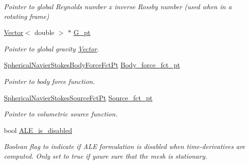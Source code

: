 \begin{DoxyCompactItemize}
\begin{DoxyCompactList}\small\item\em Pointer to global Reynolds number x inverse Rossby number (used when in a rotating frame) \end{DoxyCompactList}\item 
\hyperlink{classoomph_1_1Vector}{Vector}$<$ double $>$ $\ast$ \hyperlink{classoomph_1_1SphericalNavierStokesEquations_a658fccedce092b905f74278e882e34f1}{G\+\_\+pt}
\begin{DoxyCompactList}\small\item\em Pointer to global gravity \hyperlink{classoomph_1_1Vector}{Vector}. \end{DoxyCompactList}\item 
\hyperlink{classoomph_1_1SphericalNavierStokesEquations_aee36bea87063e9648a488de9e21f551d}{Spherical\+Navier\+Stokes\+Body\+Force\+Fct\+Pt} \hyperlink{classoomph_1_1SphericalNavierStokesEquations_ad1847f826dc0e33cb793319bfa41d985}{Body\+\_\+force\+\_\+fct\+\_\+pt}
\begin{DoxyCompactList}\small\item\em Pointer to body force function. \end{DoxyCompactList}\item 
\hyperlink{classoomph_1_1SphericalNavierStokesEquations_abd522fea532c3de15dbe80205e53bdf8}{Spherical\+Navier\+Stokes\+Source\+Fct\+Pt} \hyperlink{classoomph_1_1SphericalNavierStokesEquations_a0f8bbc9d353784821db5781ebedeece5}{Source\+\_\+fct\+\_\+pt}
\begin{DoxyCompactList}\small\item\em Pointer to volumetric source function. \end{DoxyCompactList}\item 
bool \hyperlink{classoomph_1_1SphericalNavierStokesEquations_ae99a23d65958a96ae2d90151b86d30ab}{A\+L\+E\+\_\+is\+\_\+disabled}
\begin{DoxyCompactList}\small\item\em Boolean flag to indicate if A\+LE formulation is disabled when time-\/derivatives are computed. Only set to true if you\textquotesingle{}re sure that the mesh is stationary. \end{DoxyCompactList}\end{DoxyCompactItemize}

